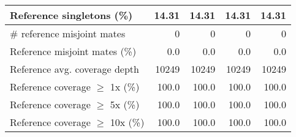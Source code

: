 \documentclass[12pt,a4paper]{article}
\begin{document}
\begin{table}[ht]
\begin{center}
\begin{tabular}{|l*{4}{|r}|}
Reference singletons (\%) & 14.31 & 14.31 & 14.31 & 14.31 \\ \hline
\# reference misjoint mates & 0 & 0 & 0 & 0 \\ \hline
Reference misjoint mates (\%) & 0.0 & 0.0 & 0.0 & 0.0 \\ \hline
Reference avg. coverage depth & 10249 & 10249 & 10249 & 10249 \\ \hline
Reference coverage $\geq$ 1x (\%) & 100.0 & 100.0 & 100.0 & 100.0 \\ \hline
Reference coverage $\geq$ 5x (\%) & 100.0 & 100.0 & 100.0 & 100.0 \\ \hline
Reference coverage $\geq$ 10x (\%) & 100.0 & 100.0 & 100.0 & 100.0 \\ \hline
\end{tabular}
\end{center}
\end{table}
\end{document}
